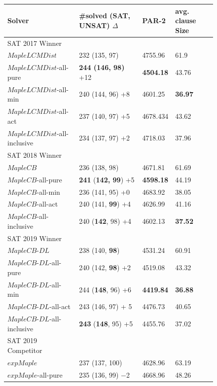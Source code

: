 \documentclass[runningheads]{llncs}
\newcommand{\fss}[2]{\fontsize{#1}{#2}\selectfont}
\newcommand{\MapleSeven}{\textit{MapleLCMDist}}
\newcommand{\MapleNineShort}{\textit{MapleCB-DL} }
\newcommand{\expSATShort}{\textit{expMaple} }
\newcommand{\MapleEightShort}{\textit{MapleCB}}
\begin{document}
\begin{figure} 
\begin{center}
\fss{8pt}{10pt}
\begin{tabular}{|l|l|l|l|} 
\hline
Solver & \#solved (SAT, UNSAT) $\Delta$ & PAR-2 & avg. clause Size \\ 
\hline
SAT 2017 Winner & & & \\
$\MapleSeven$ & 232 (135, 97) & 4755.96 & 61.9  \\ 
\hline
$\MapleSeven$-all-pure & \textbf{244 (146, 98)} +12 & \textbf{4504.18} & 43.76 \\
\hline
$\MapleSeven$-all-min & 240 (144, 96) +8 & 4601.25 & \textbf{36.97} \\ 
\hline
$\MapleSeven$-all-act & 237 (140, 97) +5 & 4678.434 & 43.62 \\ 
\hline
$\MapleSeven$-all-inclusive & 234 (137, 97) +2 & 4718.03 & 37.96 \\
\hline
\hline
SAT 2018 Winner & & & \\
$\MapleEightShort$ & 236 (138, 98) & 4671.81 & 61.69 \\
\hline
$\MapleEightShort$-all-pure & \textbf{241} (\textbf{142, 99}) +5 & \textbf{4598.18} & 44.19 \\
\hline
$\MapleEightShort$-all-min & 236 (141, 95) +0 & 4683.92 & 38.05 \\ 
\hline
$\MapleEightShort$-all-act & 240 (141, \textbf{99}) +4 & 4626.99 & 41.16 \\
\hline
$\MapleEightShort$-all-inclusive & 240 (\textbf{142}, 98) +4 & 4602.13 & \textbf{37.52} \\
\hline
\hline
SAT 2019 Winner & & & \\
$\MapleNineShort$ & 238 (140, \textbf{98}) & 4531.24 & 60.91 \\
\hline
$\MapleNineShort$-all-pure & 240 (142, \textbf{98}) +2 & 4519.08 &  43.32\\
\hline
$\MapleNineShort$-all-min & 244 (\textbf{148}, 96) +6 & \textbf{4419.84} & \textbf{36.88} \\
\hline
$\MapleNineShort$-all-act & 243 (146, 97) + 5 & 4476.73 & 40.65 \\
\hline
$\MapleNineShort$-all-inclusive & \textbf{243} (\textbf{148}, 95) +5 & 4455.76 & 37.02 \\
\hline
\hline
SAT 2019 Competitor & & &\\
$\expSATShort$ & 237 (137, 100)  & 4628.96 & 63.19 \\
\hline
$\expSATShort$-all-pure & 235 (136, 99) $-$2  & 4668.96 & 48.26 \\

\end{tabular}
\end{center}
\end{figure}
\end{document}
